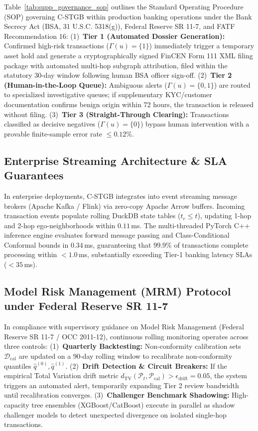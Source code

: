 \documentclass[journal,twoside]{IEEEtran}
\begin{document}
Table~\ref{tab:supp_governance_sop} outlines the Standard Operating Procedure (SOP) governing C-STGB within production banking operations under the Bank Secrecy Act (BSA, 31 U.S.C. 5318(g)), Federal Reserve SR 11-7, and FATF Recommendation 16: (1)~\textbf{Tier 1 (Automated Dossier Generation):} Confirmed high-risk transactions ($\Gamma(u) = \{1\}$) immediately trigger a temporary asset hold and generate a cryptographically signed FinCEN Form 111 XML filing package with automated multi-hop subgraph attribution, filed within the statutory 30-day window following human BSA officer sign-off. (2)~\textbf{Tier 2 (Human-in-the-Loop Queue):} Ambiguous alerts ($\Gamma(u) = \{0, 1\}$) are routed to specialized investigative queues; if supplementary KYC/customer documentation confirms benign origin within 72 hours, the transaction is released without filing. (3)~\textbf{Tier 3 (Straight-Through Clearing):} Transactions classified as decisive negatives ($\Gamma(u) = \{0\}$) bypass human intervention with a provable finite-sample error rate $\le 0.12\%$.

\subsection{Enterprise Streaming Architecture \& SLA Guarantees}
In enterprise deployments, C-STGB integrates into event streaming message brokers (Apache Kafka / Flink) via zero-copy Apache Arrow buffers. Incoming transaction events populate rolling DuckDB state tables ($t_e \le t$), updating 1-hop and 2-hop ego-neighborhoods within $0.11$\,ms. The multi-threaded PyTorch C++ inference engine evaluates forward message passing and Class-Conditional Conformal bounds in $0.34$\,ms, guaranteeing that $99.9\%$ of transactions complete processing within $<1.0$\,ms, substantially exceeding Tier-1 banking latency SLAs ($< 35$\,ms).

\subsection{Model Risk Management (MRM) Protocol under Federal Reserve SR 11-7}
In compliance with supervisory guidance on Model Risk Management (Federal Reserve SR 11-7 / OCC 2011-12), continuous rolling monitoring operates across three controls: (1)~\textbf{Quarterly Backtesting:} Non-conformity calibration sets $\mathcal{D}_{\text{cal}}$ are updated on a 90-day rolling window to recalibrate non-conformity quantiles $\hat{q}^{(0)}, \hat{q}^{(1)}$. (2)~\textbf{Drift Detection \& Circuit Breakers:} If the empirical Total Variation drift metric $d_{\text{TV}}(\mathcal{P}_t, \mathcal{P}_{\text{cal}}) > \epsilon_{\text{drift}} = 0.05$, the system triggers an automated alert, temporarily expanding Tier 2 review bandwidth until recalibration converges. (3)~\textbf{Challenger Benchmark Shadowing:} High-capacity tree ensembles (XGBoost/CatBoost) execute in parallel as shadow challenger models to detect unexpected divergence on isolated single-hop transactions.
\end{document}

